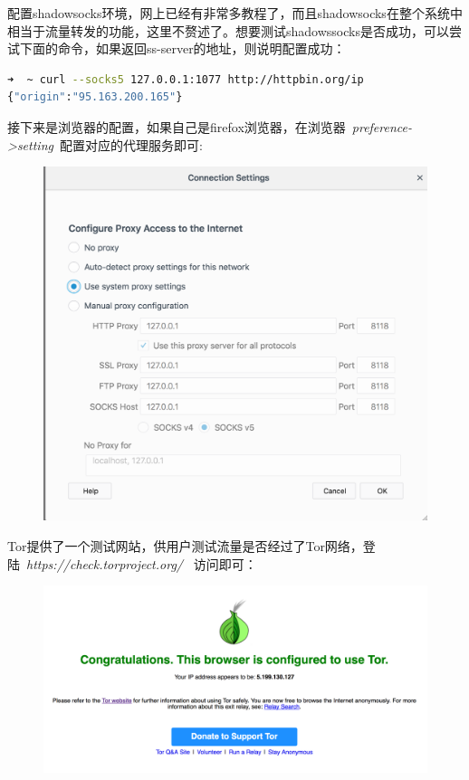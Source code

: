 \documentclass[12pt]{article}  %
\begin{document}
\par
配置shadowsocks环境，网上已经有非常多教程了，而且shadowsocks在整个系统中相当于流量转发的功能，这里不赘述了。想要测试shadowssocks是否成功，可以尝试下面的命令，如果返回ss-server的地址，则说明配置成功：
\begin{lstlisting}[language=sh]
➜  ~ curl --socks5 127.0.0.1:1077 http://httpbin.org/ip
{"origin":"95.163.200.165"}
\end{lstlisting}
\par
接下来是浏览器的配置，如果自己是firefox浏览器，在浏览器\  \emph{preference->setting}\  配置对应的代理服务即可:
\begin{figure}[H]
\centering
\includegraphics[scale=0.3]{pic/proxy.png}
\end{figure}
\par
Tor提供了一个测试网站，供用户测试流量是否经过了Tor网络，登陆\ \emph{https://check.torproject.org/} \ 访问即可：
\begin{figure}[H]
\centering
\includegraphics[scale=0.3]{pic/succed.png}
\end{figure}
\end{document}
